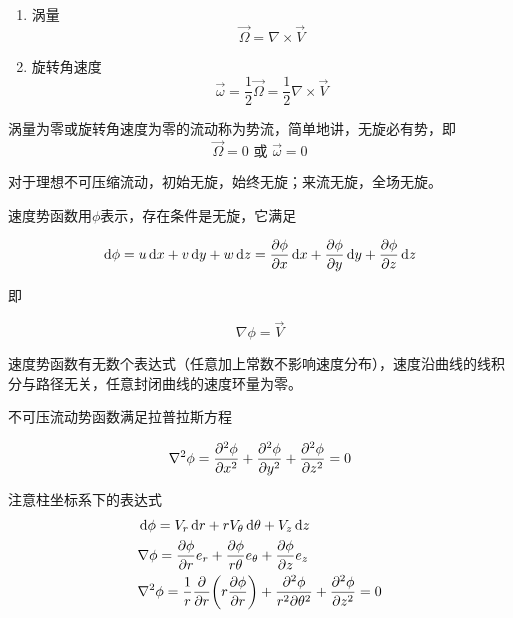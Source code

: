 

\begin{enumerate}
	\item 涡量
	\begin{equation}
		\vec{\Omega} = \nabla \times \vec{V}
	\end{equation}
    \item 旋转角速度
    \begin{equation}
    	\vec{\omega} = \dfrac{1}{2} \vec{\Omega} = \dfrac{1}{2} \nabla \times \vec{V}
    \end{equation}
\end{enumerate}

\begin{definition}[势流]
	涡量为零或旋转角速度为零的流动称为势流，简单地讲，无旋必有势，即
	\begin{equation}
		\vec{\Omega} = 0 \text{~或~} \vec{\omega} = 0
	\end{equation}
\end{definition}

对于理想不可压缩流动，初始无旋，始终无旋；来流无旋，全场无旋。


速度势函数用$\phi$表示，存在条件是无旋，它满足

\begin{equation}
	\dd{\phi} = u\dd{x} + v\dd{y} + w\dd{z} = \pdv{\phi}{x} \dd{x} + \pdv{\phi}{y} \dd{y} + \pdv{\phi}{z} \dd{z}
\end{equation}

即

\begin{equation}
	\nabla \phi = \vec{V}
\end{equation}

速度势函数有无数个表达式（任意加上常数不影响速度分布），速度沿曲线的线积分与路径无关，任意封闭曲线的速度环量为零。

不可压流动势函数满足拉普拉斯方程

\begin{equation}
	\nabla^2 \phi = \pdv[2]{\phi}{x} + \pdv[2]{\phi}{y} + \pdv[2]{\phi}{z}= 0
\end{equation}

注意柱坐标系下的表达式
\begin{align*}
	&\dd{\phi} = V_r \dd{r} + rV_{\theta} \dd{\theta} + V_z \dd{z}\\
	&\nabla\phi = \pdv{\phi}{r}e_r + \dfrac{\partial \phi}{r \theta} e_{\theta} + \pdv{\phi}{z} e_z\\
	&\nabla^2 \phi = \dfrac{1}{r} \pdv{r}\qty(r\pdv{\phi}{r}) + \dfrac{\partial^2 \phi}{r^2 \partial \theta^2} + \pdv[2]{\phi}{z} = 0
\end{align*}

